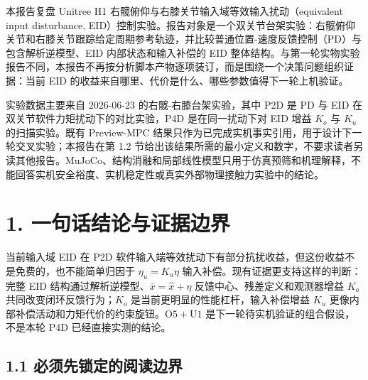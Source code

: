 ﻿本报告复盘 Unitree H1 右髋俯仰与右膝关节输入域等效输入扰动（equivalent input disturbance, EID）控制实验。报告对象是一个双关节台架实验：右髋俯仰关节和右膝关节跟踪给定周期参考轨迹，并比较普通位置-速度反馈控制（PD）与包含解析逆模型、EID 内部状态和输入补偿的 EID 整体结构。与第一轮实物实验报告不同，本报告不再按分析脚本产物逐项装订，而是围绕一个决策问题组织证据：当前 EID 的收益来自哪里、代价是什么、哪些参数值得下一轮上机验证。

实验数据主要来自 2026-06-23 的右髋-右膝台架实验，其中 P2D 是 PD 与 EID 在双关节软件力矩扰动下的对比实验，P4D 是在同一扰动下对 EID 增益 \(K_o\) 与 \(K_u\) 的扫描实验。既有 Preview-MPC 结果只作为已完成实机事实引用，用于设计下一轮交叉实验；本报告在第 1.2 节给出该结果所需的最小定义和数字，不要求读者另读其他报告。MuJoCo、结构消融和局部线性模型只用于仿真预筛和机理解释，不能回答实机安全裕度、实机稳定性或真实外部物理接触力实验中的结论。

\section{1. 一句话结论与证据边界}
\label{sec:one-line}

当前输入域 EID 在 P2D 软件输入端等效扰动下有部分抗扰收益，但这份收益不是免费的，也不能简单归因于 \(\eta_u=K_u\eta\) 输入补偿。现有证据更支持这样的判断：完整 EID 结构通过解析逆模型、\(\bar{x}=\hat{x}+\eta\) 反馈中心、残差定义和观测器增益 \(K_o\) 共同改变闭环反馈行为；\(K_o\) 是当前更明显的性能杠杆，输入补偿增益 \(K_u\) 更像内部补偿活动和力矩代价的约束旋钮。\(\mathrm{O5+U1}\) 是下一轮待实机验证的组合假设，不是本轮 P4D 已经直接实测的结论。

\subsection{1.1 必须先锁定的阅读边界}

